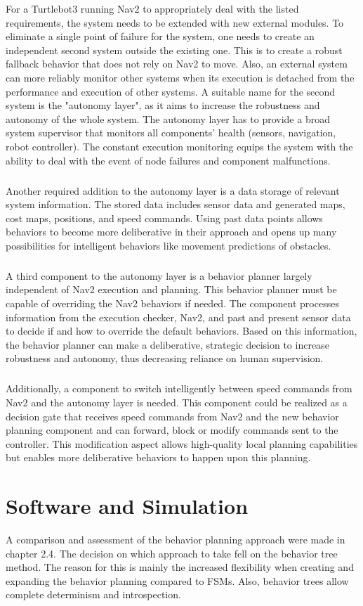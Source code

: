 For a Turtlebot3 running Nav2 to appropriately deal with the listed requirements, the system needs to be extended with new external modules. To eliminate a single point of failure for the system, one needs to create an independent second system outside the existing one. This is to create a robust fallback behavior that does not rely on Nav2 to move. Also, an external system can more reliably monitor other systems when its execution is detached from the performance and execution of other systems. 
A suitable name for the second system is the "autonomy layer", as it aims to increase the robustness and autonomy of the whole system. 
The autonomy layer has to provide a broad system supervisor that monitors all components' health (sensors, navigation, robot controller). The constant execution monitoring equips the system with the ability to deal with the event of node failures and component malfunctions. 
\subparagraph*{}
Another required addition to the autonomy layer is a data storage of relevant system information. The stored data includes sensor data and generated maps, cost maps, positions, and speed commands. Using past data points allows behaviors to become more deliberative in their approach and opens up many possibilities for intelligent behaviors like movement predictions of obstacles. 
\subparagraph*{}
A third component to the autonomy layer is a behavior planner largely independent of Nav2 execution and planning. This behavior planner must be capable of overriding the Nav2 behaviors if needed. The component processes information from the execution checker, Nav2, and past and present sensor data to decide if and how to override the default behaviors. Based on this information, the behavior planner can make a deliberative, strategic decision to increase robustness and autonomy, thus decreasing reliance on human supervision.
\subparagraph*{}
Additionally, a component to switch intelligently between speed commands from Nav2 and the autonomy layer is needed. This component could be realized as a decision gate that receives speed commands from Nav2 and the new behavior planning component and can forward, block or modify commands sent to the controller. This modification aspect allows high-quality local planning capabilities but enables more deliberative behaviors to happen upon this planning.


\section{Software and Simulation}
A comparison and assessment of the behavior planning approach were made in chapter 2.4. The decision on which approach to take fell on the behavior tree method. The reason for this is mainly the increased flexibility when creating and expanding the behavior planning compared to FSMs. Also, behavior trees allow complete determinism and introspection.

